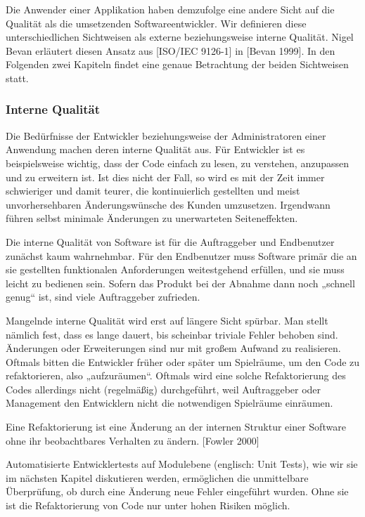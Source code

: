 Die Anwender einer Applikation haben demzufolge eine andere Sicht auf die Qualität als die umsetzenden Softwareentwickler. Wir definieren diese unterschiedlichen Sichtweisen als externe beziehungsweise interne Qualität. Nigel Bevan erläutert diesen Ansatz aus [ISO/IEC 9126-1] in [Bevan 1999]. In den Folgenden zwei Kapiteln findet eine genaue Betrachtung der beiden Sichtweisen statt.

\subsubsection{Interne Qualität}
Die Bedürfnisse der Entwickler beziehungsweise der Administratoren einer Anwendung machen deren interne Qualität aus. Für Entwickler ist es beispielsweise wichtig, dass der
Code einfach zu lesen, zu verstehen, anzupassen und zu erweitern ist. Ist dies nicht der Fall, so wird es mit der Zeit immer schwieriger und damit teurer, die kontinuierlich gestellten
und meist unvorhersehbaren Änderungswünsche des Kunden umzusetzen. Irgendwann führen selbst minimale Änderungen zu unerwarteten Seiteneffekten.

Die interne Qualität von Software ist für die Auftraggeber und Endbenutzer zunächst kaum wahrnehmbar. Für den Endbenutzer muss Software primär die an sie gestellten funktionalen 
Anforderungen weitestgehend erfüllen, und sie muss leicht zu bedienen sein. Sofern das Produkt bei der Abnahme dann noch „schnell genug“ ist, sind viele Auftraggeber zufrieden.

Mangelnde interne Qualität wird erst auf längere Sicht spürbar. Man stellt nämlich fest, dass es lange dauert, bis scheinbar triviale Fehler behoben sind. Änderungen oder 
Erweiterungen sind nur mit großem Aufwand zu realisieren. Oftmals bitten die Entwickler früher oder später um Spielräume, um den Code zu refaktorieren, also „aufzuräumen“. Oftmals
wird eine solche Refaktorierung des Codes allerdings nicht (regelmäßig) durchgeführt, weil Auftraggeber oder Management den Entwicklern nicht die notwendigen Spielräume einräumen.

Eine Refaktorierung ist eine Änderung an der internen Struktur einer Software ohne ihr beobachtbares Verhalten zu ändern. [Fowler 2000]

Automatisierte Entwicklertests auf Modulebene (englisch: Unit Tests), wie wir sie im nächsten Kapitel diskutieren werden, ermöglichen die unmittelbare Überprüfung, 
ob durch eine Änderung neue Fehler eingeführt wurden. Ohne sie ist die Refaktorierung von Code nur unter hohen Risiken möglich.

